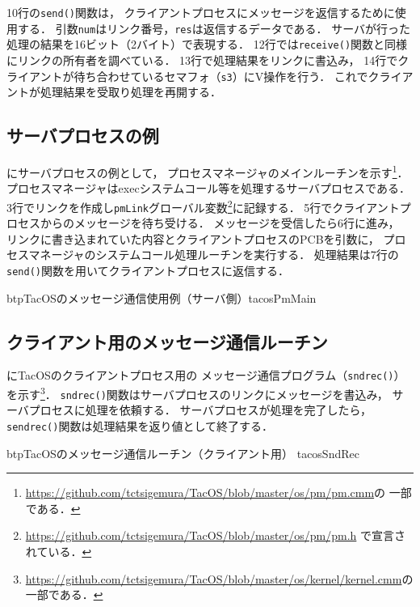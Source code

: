 10行の{\tt send()}関数は，
クライアントプロセスにメッセージを返信するために使用する．
引数{\tt num}はリンク番号，{\tt res}は返信するデータである．
サーバが行った処理の結果を16ビット（2バイト）で表現する．
12行では{\tt receive()}関数と同様にリンクの所有者を調べている．
13行で処理結果をリンクに書込み，
14行でクライアントが待ち合わせているセマフォ（{\tt s3}）にV操作を行う．
これでクライアントが処理結果を受取り処理を再開する．

\subsection{サーバプロセスの例}
にサーバプロセスの例として，
プロセスマネージャのメインルーチンを示す\footnote{
\url{https://github.com/tctsigemura/TacOS/blob/master/os/pm/pm.cmm}の
一部である．}．
プロセスマネージャはexecシステムコール等を処理するサーバプロセスである．
3行でリンクを作成し{\tt pmLink}グローバル変数\footnote{
\url{https://github.com/tctsigemura/TacOS/blob/master/os/pm/pm.h}
で宣言されている．}に記録する．
5行でクライアントプロセスからのメッセージを待ち受ける．
メッセージを受信したら6行に進み，
リンクに書き込まれていた内容とクライアントプロセスのPCBを引数に，
プロセスマネージャのシステムコール処理ルーチンを実行する．
処理結果は7行の{\tt send()}関数を用いてクライアントプロセスに返信する．

\begin{myfig}{btp}{TacOSのメッセージ通信使用例（サーバ側）}{tacosPmMain}

\end{myfig}

\subsection{クライアント用のメッセージ通信ルーチン}
にTacOSのクライアントプロセス用の
メッセージ通信プログラム（{\tt sndrec()}）を示す\footnote{
\url{https://github.com/tctsigemura/TacOS/blob/master/os/kernel/kernel.cmm}の
一部である．}．
{\tt sndrec()}関数はサーバプロセスのリンクにメッセージを書込み，
サーバプロセスに処理を依頼する．
サーバプロセスが処理を完了したら，
{\tt sendrec()}関数は処理結果を返り値として終了する．

\begin{myfig}{btp}{TacOSのメッセージ通信ルーチン（クライアント用）}
{tacosSndRec}

\end{myfig}

